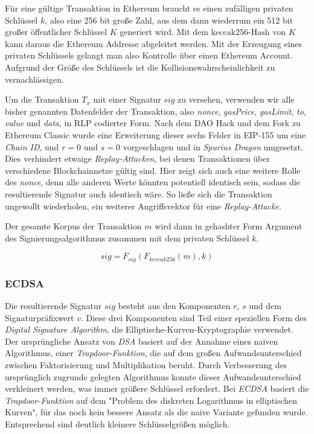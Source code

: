 \documentclass[runningheads]{llncs}
\begin{document}
Für eine gültige Transaktion in Ethereum braucht es einen zufälligen privaten Schlüssel $ k $, also eine 256 bit große Zahl, aus dem dann wiederrum ein 512 bit großer öffentlicher Schlüssel $ K $ generiert wird. Mit dem $ \text{keccak256-Hash} $ von $ K $ kann daraus die Ethereum Addresse abgeleitet werden. Mit der Erzeugung eines privaten Schlüssels gelangt man also Kontrolle über einen Ethereum Account. Aufgrund der Größe des Schlüssels ist die Kollisionswahrscheinlichkeit zu vernachlässigen.

Um die Transaktion $ T_x $ mit einer Signatur $ sig $ zu versehen, verwenden wir alle bisher genannten Datenfelder der Transaktion, also \textit{nonce}, \textit{gasPrice}, \textit{gasLimit}, \textit{to}, \textit{value} und \textit{data}, in RLP codierter Form. Nach dem DAO Hack und dem Fork zu Ethereum Classic wurde eine Erweiterung dieser sechs Felder in EIP-155 \cite{noauthor_ethereum/eips_nodate} um eine \textit{Chain ID}, und $ r = 0 $ und $ s = 0 $ vorgeschlagen und in \textit{Spurius Dragon} umgesetzt. Dies verhindert etwaige \textit{Replay-Attacken}, bei denen Transaktionen über verschiedene Blockchainnetze gültig sind. \cite[S. 138]{iyer_cryptoeconomics_2018} Hier zeigt sich auch eine weitere Rolle des \textit{nonce}, denn alle anderen Werte könnten potentiell identisch sein, sodass die resultierende Signatur auch identisch wäre. So ließe sich die Transaktion ungewollt wiederholen, ein weiterer Angriffsvektor für eine \textit{Replay-Attacke}.

Der gesamte Korpus der Transaktion $ m $ wird dann in gehashter Form Argument des Signierungsalgorithmus zusammen mit dem privaten Schlüssel $ k $.

$$
  sig = F_{sig}(F_{keccak256}(m), k)
$$

\subsubsection{ECDSA}
\label{ecdsa}
Die resultierende Signatur $ sig $ besteht aus den Komponenten $ r $, $ s $ und dem Signaturpräfixwert $ v $.  Diese drei Komponenten sind Teil einer speziellen Form des \textit{Digital Signature Algorithm}, die Elliptische-Kurven-Kryptographie verwendet. Der ursprüngliche Ansatz von \textit{DSA} basiert auf der Annahme eines naiven Algorithmus, einer \textit{Trapdoor-Funktion}, die auf dem großen Aufwandsunterschied zwischen Faktorisierung und Multiplikation beruht. Durch Verbesserung des ursprünglich zugrunde gelegten Algorithmus konnte dieser Aufwandsunterschied verkleinert werden, was immer größere Schlüssel erfordert. Bei \textit{ECDSA} basiert die \textit{Trapdoor-Funktion} auf dem "Problem des diskreten Logarithmus in elliptischen Kurven", für das noch kein bessere Ansatz als die naive Variante gefunden wurde. Entsprechend sind deutlich kleinere Schlüsselgrößen möglich. \cite{noauthor_elliptic_2020}
\end{document}
